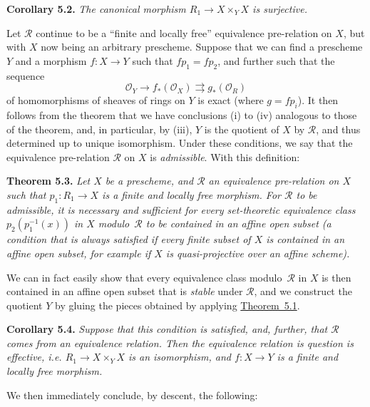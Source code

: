 \documentclass{article}
\newenvironment{itenv}[1]
  {\phantomsection\par\medskip\noindent\textbf{#1.}\itshape}
  {\medskip}
\renewcommand{\cal}[1]{{\mathcal{#1}}}
\newcommand{\oldpage}[1]{\marginpar{\footnotesize$\Big\vert$ \textit{p.~#1}}}
\begin{document}
\begin{itenv}{Corollary 5.2}
  The canonical morphism $R_1\to X\times_Y X$ is \emph{surjective}.
\end{itenv}

Let $\cal{R}$ continue to be a ``finite and locally free'' equivalence pre-relation on $X$, but with $X$ now being an arbitrary prescheme.
Suppose that we can find a prescheme $Y$ and a morphism $f\colon X\to Y$ such that $fp_1=fp_2$, and further such that the sequence
\[
  \cal{O}_Y \to f_*(\cal{O}_X) \rightrightarrows g_*(\cal{O}_R)
\]
of homomorphisms of sheaves of rings on $Y$ is exact (where $g=fp_i$).
It then follows from the theorem that we have conclusions (i) to (iv) analogous to those of the theorem, and, in particular, by (iii), $Y$ is the quotient of $X$ by $\cal{R}$, and thus determined up to unique isomorphism.
Under these conditions, we say that the equivalence pre-relation $\cal{R}$ on $X$ is \emph{admissible}.
With this definition:

\begin{itenv}{Theorem 5.3}
\label{theorem5.3}
  Let $X$ be a prescheme, and $\cal{R}$ an equivalence pre-relation on $X$ such that $p_1\colon R_1\to X$ is a finite and locally free morphism.
  For $\cal{R}$ to be admissible, it is necessary and sufficient for every set-theoretic equivalence class $p_2(p_1^{-1}(x))$ in $X$ modulo~$\cal{R}$ to be contained in an affine open subset (a condition that is always satisfied if every finite subset of $X$ is contained in an affine open subset, for example if $X$ is quasi-projective over an affine scheme).
\end{itenv}

We can in fact easily show that every equivalence class modulo~$\cal{R}$ in $X$ is then contained in an affine open subset that is \emph{stable} under $\cal{R}$, and we construct the quotient $Y$ by gluing the pieces obtained by applying \hyperref[theorem5.1]{Theorem~5.1}.

\oldpage{212-14}
\begin{itenv}{Corollary 5.4}
\label{corollary5.4}
  Suppose that this condition is satisfied, and, further, that $\cal{R}$ comes from an equivalence relation.
  Then the equivalence relation is question is effective, i.e. $R_1\to X\times_Y X$ is an isomorphism, and $f\colon X\to Y$ is a finite and locally free morphism.
\end{itenv}

We then immediately conclude, by descent, the following:
\end{document}
